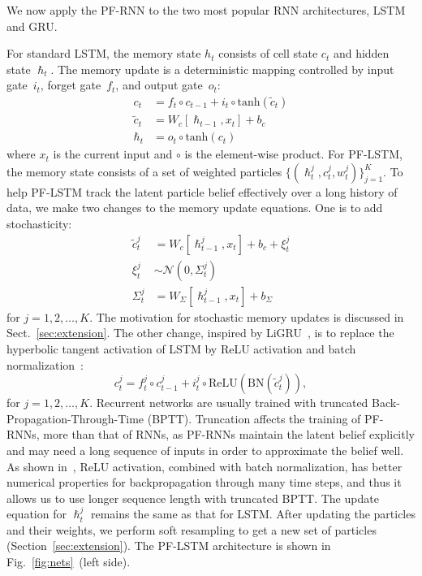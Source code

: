 \documentclass[letterpaper]{article} %
\begin{document}
We now apply the PF-RNN to the two most popular RNN architectures, LSTM and GRU. 

For standard LSTM, the memory state $h_t$ consists of cell state $c_t$ and hidden state $\hslash_t$. The  memory   update is a  deterministic mapping controlled by   input gate~$i_t$,   forget gate~$f_t$, and output gate~$o_t$:
\begin{align}
	c_t &= f_t \circ c_{t-1} + i_t\circ \textrm{tanh}(\tilde{c}_t)\\
	\tilde{c}_t &= W_c[\hslash_{t-1}, x_t] + b_c\\
	\hslash_t &= o_t\circ\textrm{tanh}(c_t)
\end{align}
where $x_t$ is the current input and $\circ$ is the element-wise product.
For PF-LSTM, the memory state consists of a set of weighted particles $\{(\hslash_t^j, c_t^j, w_t^j)\}_{j=1}^K$.  To help PF-LSTM  track the latent particle belief effectively over a long history of data, we make two changes to the memory update equations. One is to add stochasticity: 
\begin{align}
	\tilde{c}_t^j &= W_c[\hslash_{t-1}^j, x_t] + b_c + \xi_t^j\\
	\xi_t^j &\sim \mathcal{N}(0, \Sigma_t^j)\\
	\Sigma_t^j &= W_\Sigma[\hslash_{t-1}^j, x_t] + b_\Sigma
\end{align}
for  $j=1,2,\ldots, K$. The motivation for stochastic memory updates is discussed in Sect.~\ref{sec:extension}.
The other change, inspired by  LiGRU~\cite{ravanelli2018light}, is to replace the hyperbolic tangent activation of LSTM  by  ReLU activation and batch normalization~\cite{ioffe2015batch}: 
\begin{equation}
	c_t^j = f_t^j\circ c_{t-1}^j + i_t^j\circ \textrm{ReLU}(\textrm{BN}(\tilde{c}_t^j)),
\end{equation} 
for $j=1,2,\ldots, K$.  Recurrent networks are usually trained with truncated Back-Propagation-Through-Time (BPTT). %
Truncation affects the training of PF-RNNs, more than that of RNNs, as PF-RNNs maintain the latent belief  explicitly and may need a long sequence of inputs in order to approximate the belief well.
As shown in~\cite{ravanelli2018light}, 
ReLU activation, combined with batch normalization, has better numerical properties for backpropagation through many time steps, and thus it allows us to use longer sequence length with truncated BPTT.
The update equation for $\hslash_t^j$ remains the same as that for LSTM.
After updating the particles and their weights, we perform soft resampling to get a new set of particles (Section~\ref{sec:extension}). The PF-LSTM architecture is shown in Fig.~\ref{fig:nets}~(left side).
\end{document}
